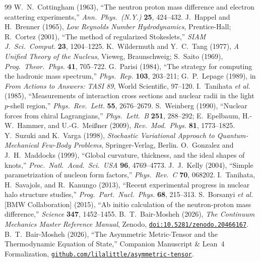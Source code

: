 \documentclass[11pt, a4paper]{article}
\begin{document}
\begin{thebibliography}{99}
 W.~N.~Cottingham (1963), ``The neutron proton mass difference and electron scattering experiments,'' \textit{Ann.\ Phys.\ (N.Y.)} \textbf{25}, 424--432.
 J.~Happel and H.~Brenner (1965), \textit{Low Reynolds Number Hydrodynamics}, Prentice-Hall; R.~Cortez (2001), ``The method of regularized Stokeslets,'' \textit{SIAM J.\ Sci.\ Comput.} \textbf{23}, 1204--1225.
 K.~Wildermuth and Y.~C.~Tang (1977), \textit{A Unified Theory of the Nucleus}, Vieweg, Braunschweig; S.~Saito (1969), \textit{Prog.\ Theor.\ Phys.} \textbf{41}, 705--722.
 G.~Parisi (1984), ``The strategy for computing the hadronic mass spectrum,'' \textit{Phys.\ Rep.} \textbf{103}, 203--211; G.~P.~Lepage (1989), in \textit{From Actions to Answers: TASI 89}, World Scientific, 97--120.
 I.~Tanihata \textit{et al.} (1985), ``Measurements of interaction cross sections and nuclear radii in the light $p$-shell region,'' \textit{Phys.\ Rev.\ Lett.} \textbf{55}, 2676--2679.
 S.~Weinberg (1990), ``Nuclear forces from chiral Lagrangians,'' \textit{Phys.\ Lett.\ B} \textbf{251}, 288--292; E.~Epelbaum, H.-W.~Hammer, and U.-G.~Mei\ss ner (2009), \textit{Rev.\ Mod.\ Phys.} \textbf{81}, 1773--1825.
 Y.~Suzuki and K.~Varga (1998), \textit{Stochastic Variational Approach to Quantum-Mechanical Few-Body Problems}, Springer-Verlag, Berlin.
 O.~Gonzalez and J.~H.~Maddocks (1999), ``Global curvature, thickness, and the ideal shapes of knots,'' \textit{Proc.\ Natl.\ Acad.\ Sci.\ USA} \textbf{96}, 4769--4773.
 J.~J.~Kelly (2004), ``Simple parametrization of nucleon form factors,'' \textit{Phys.\ Rev.\ C} \textbf{70}, 068202.
 I.~Tanihata, H.~Savajols, and R.~Kanungo (2013), ``Recent experimental progress in nuclear halo structure studies,'' \textit{Prog.\ Part.\ Nucl.\ Phys.} \textbf{68}, 215--313.
 S.~Borsanyi \textit{et al.} [BMW Collaboration] (2015), ``Ab initio calculation of the neutron-proton mass difference,'' \textit{Science} \textbf{347}, 1452--1455.
 B.~T.~Bair-Mosheh (2026), \textit{The Continuum Mechanics Master Reference Manual}, Zenodo, \href{https://doi.org/10.5281/zenodo.20466167}{\texttt{doi:10.5281/zenodo.20466167}}.
 B.~T.~Bair-Mosheh (2026), ``The Asymmetric Metric-Tensor and the Thermodynamic Equation of State,'' Companion Manuscript \& Lean~4 Formalization, \href{https://github.com/lilalittle/asymmetric-tensor}{\texttt{github.com/lilalittle/asymmetric-tensor}}.

\end{thebibliography}
\end{document}
